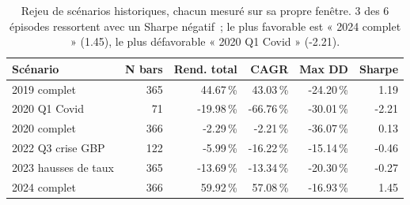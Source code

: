 \begin{table}[H]
\centering
\caption{Rejeu de scénarios historiques, chacun mesuré sur sa propre fenêtre. 3 des 6 épisodes ressortent avec un Sharpe négatif~; le plus favorable est « 2024 complet » (1.45), le plus défavorable « 2020 Q1 Covid » (-2.21).}
\label{tab:scenarios}
\begin{tabular}{lrrrrr}
\toprule
Scénario & N bars & Rend. total & CAGR & Max DD & Sharpe \\
\midrule
2019 complet & 365 & 44.67\,\% & 43.03\,\% & -24.20\,\% & 1.19 \\
2020 Q1 Covid & 71 & -19.98\,\% & -66.76\,\% & -30.01\,\% & -2.21 \\
2020 complet & 366 & -2.29\,\% & -2.21\,\% & -36.07\,\% & 0.13 \\
2022 Q3 crise GBP & 122 & -5.99\,\% & -16.22\,\% & -15.14\,\% & -0.46 \\
2023 hausses de taux & 365 & -13.69\,\% & -13.34\,\% & -20.30\,\% & -0.27 \\
2024 complet & 366 & 59.92\,\% & 57.08\,\% & -16.93\,\% & 1.45 \\
\bottomrule
\end{tabular}
\end{table}

